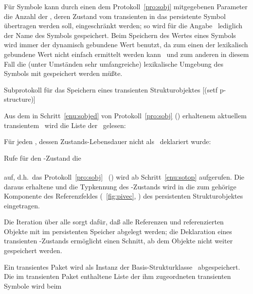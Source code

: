 %
\par{}F\"{u}r Symbole kann durch einen dem Protokoll~\ref{pro:sobj}
mitgegebenen Parameter die Anzahl der \Slt[s], deren Zustand vom
transienten in das persistente Symbol \"{u}bertragen werden soll,
eingeschr\"{a}nkt werden; so wird f\"{u}r die Angabe
\ lediglich der Name des Symbols gespeichert. Beim
Speichern des Wertes eines Symbols wird immer der dynamisch gebundene
Wert benutzt, da zum einen der lexikalisch gebundene Wert nicht
einfach ermittelt werden kann \ und zum anderen in diesem
Fall die (unter Umst\"{a}nden sehr umfangreiche) lexikalische Umgebung
des Symbols mit gespeichert werden m\"{u}\ss{}te.
%
\begin{infol}%
%
\acaption%
 {Subprotokoll f\"{u}r das Speichern eines transienten
  Strukturobjektes}%
 [(setf p-structure)]%
 \label{pro:sstr}%
%
\item Aus dem in Schritt~\ref{enu:sobjed} von Protokoll~\ref{pro:sobj}
 (\citepage{\pageref{enu:sobjed}}) erhaltenem
aktuellem transientem \clsdo\ wird die Liste der \sltdo[e]\ gelesen:\\
%
\item F\"{u}r jeden \Slt, dessen Zustands-Lebensdauer nicht als
\ deklariert wurde:
%
\begin{block}
%
\item Rufe f\"{u}r den \Slt\/-Zustand die \gfn\\
\\
auf, d.h.\ das Protokoll~\ref{pro:sobj}
\ (\citepage{\pageref{pro:sobj}}) wird ab
Schritt~\ref{enu:sotop} aufgerufen. Die daraus erhaltene \sobjid\/ und
die Typkennung des \Slt\/-Zustands wird in die zum \Slt\/ geh\"{o}rige
Komponente des Referenzfeldes (\figurename~\ref{fig:pivec},
\citepage{\pageref{fig:pivec}}) des persistenten Strukturobjektes
eingetragen.
%
\end{block}
%
\end{infol}
%
Die Iteration \"{u}ber alle \Slt[s]\/ sorgt daf\"{u}r, da\ss{} alle Referenzen
und referenzierten Objekte mit im persistenten Speicher abgelegt
werden; die Deklaration eines transienten \Slt\/-Zustands
er\-m\"{o}g\-licht einen Schnitt, ab dem Objekte nicht weiter gespeichert
werden.
%
\par{}Ein transientes Paket wird als Instanz der Basis-Strukturklasse
\ abgespeichert. Die im transienten Paket
enthaltene Liste der ihm zugeordneten transienten Symbole wird beim
